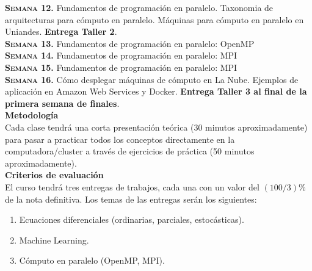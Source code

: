 \documentclass[letterpaper,10pt,onecolumn]{article}
\begin{document}
\noindent\textbf{\textsc{Semana 12.}}  
Fundamentos de programaci\'on en paralelo. Taxonomia de arquitecturas
para c\'omputo en paralelo. M\'aquinas para c\'omputo en paralelo en
Uniandes. {\bf Entrega Taller 2}.
\\[-0.3cm]  

\noindent\textbf{\textsc{Semana 13.}} 
Fundamentos de programaci\'on en paralelo: OpenMP
\\[-0.3cm]  

\noindent\textbf{\textsc{Semana 14.}} 
Fundamentos de programaci\'on en paralelo: MPI
\\[-0.3cm] 

\noindent\textbf{\textsc{Semana 15.}} 
Fundamentos de programaci\'on en paralelo: MPI
\\[-0.3cm] 

\noindent\textbf{\textsc{Semana 16.}} 
C\'omo desplegar m\'aquinas de c\'omputo en La Nube. Ejemplos de
aplicaci\'on en Amazon Web Services y Docker.  {\bf Entrega Taller 3 al final de la primera semana de finales}.
\\[-0.1cm]  


\noindent\textbf{\large {} \quad
  Metodolog\'ia}\\[-0.2cm] 


\noindent\normalsize Cada clase tendr\'a una corta presentaci\'on
te\'orica (30 minutos aproximadamente) para pasar a practicar todos
los conceptos directamente en la computadora/cluster a trav\'es de
ejercicios de pr\'actica (50 minutos aproximadamente). \\[0.1cm]


\noindent\textbf{\large {} \quad Criterios de
  evaluaci\'on}\\[-0.2cm] 


El curso tendr\'a tres entregas de trabajos, cada una con un valor
del $(100/3) \%$ de la nota definitiva. Los temas de las entregas ser\'an
los siguientes:
\begin{enumerate}
\item Ecuaciones diferenciales (ordinarias, parciales, estoc\'asticas).
\\[-0.6cm]
\item Machine Learning.
\\[-0.6cm]
\item C\'omputo en paralelo (OpenMP, MPI).
\\[-0.2cm]
\end{enumerate}
\end{document}
